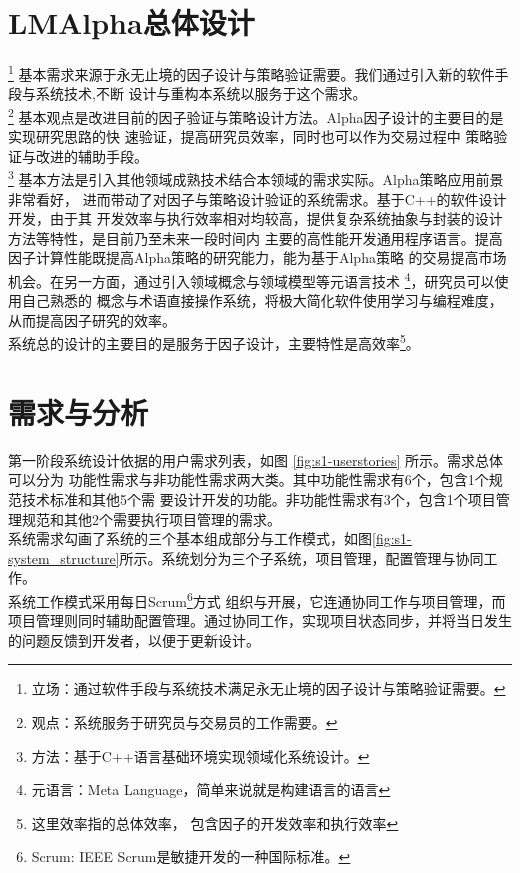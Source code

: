 \section{LMAlpha总体设计}

\footnote{立场：通过软件手段与系统技术满足永无止境的因子设计与策略验证需要。}
基本需求来源于永无止境的因子设计与策略验证需要。我们通过引入新的软件手段与系统技术,不断
设计与重构本系统以服务于这个需求。\\

\footnote{观点：系统服务于研究员与交易员的工作需要。}
基本观点是改进目前的因子验证与策略设计方法。Alpha因子设计的主要目的是实现研究思路的快
速验证，提高研究员效率，同时也可以作为交易过程中
策略验证与改进的辅助手段。\\

\footnote{方法：基于C++语言基础环境实现领域化系统设计。}
基本方法是引入其他领域成熟技术结合本领域的需求实际。Alpha策略应用前景非常看好，
进而带动了对因子与策略设计验证的系统需求。基于C++的软件设计开发，由于其
开发效率与执行效率相对均较高，提供复杂系统抽象与封装的设计方法等特性，是目前乃至未来一段时间内
主要的高性能开发通用程序语言。提高因子计算性能既提高Alpha策略的研究能力，能为基于Alpha策略
的交易提高市场机会。在另一方面，通过引入领域概念与领域模型等元语言技术
\footnote{元语言：Meta Language，简单来说就是构建语言的语言}，研究员可以使用自己熟悉的
概念与术语直接操作系统，将极大简化软件使用学习与编程难度，从而提高因子研究的效率。
\\

系统总的设计的主要目的是服务于因子设计，主要特性是高效率\footnote{这里效率指的总体效率，
包含因子的开发效率和执行效率}。\\

\section{需求与分析}

第一阶段系统设计依据的用户需求列表，如图 \ref{fig:s1-userstories} 所示。需求总体可以分为
功能性需求与非功能性需求两大类。其中功能性需求有6个，包含1个规范技术标准和其他5个需
要设计开发的功能。非功能性需求有3个，包含1个项目管理规范和其他2个需要执行项目管理的需求。\\

系统需求勾画了系统的三个基本组成部分与工作模式，如图\ref{fig:s1-system_structure}所示。系统划分为三个子系统，项目管理，配置管理与协同工作。 \\


系统工作模式采用每日Scrum\footnote{Scrum: IEEE Scrum是敏捷开发的一种国际标准。}方式
组织与开展，它连通协同工作与项目管理，而项目管理则同时辅助配置管理。通过协同工作，实现项目状态同步，并将当日发生的问题反馈到开发者，以便于更新设计。\\



